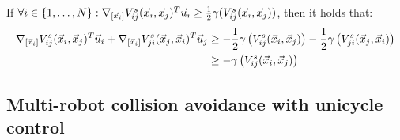 \begin{description}
        \begin{remark}
            If $\forall i \in \{1, \dots, N\}: \nabla_{[{\vec{x}}_i]} V_{ij}^s({\vec{x}}_i, {\vec{x}}_j)^T {\vec{u}}_i \geq \frac{1}{2} \gamma (V_{ij}^s({\vec{x}}_i, {\vec{x}}_j))$, then it holds that:
            \[
                \begin{split}
                    \nabla_{[{\vec{x}}_i]} V_{ij}^s({\vec{x}}_i, {\vec{x}}_j)^T {\vec{u}}_i + \nabla_{[{\vec{x}}_i]} V_{ji}^s({\vec{x}}_j, {\vec{x}}_i)^T {\vec{u}}_j 
                    &\geq -\frac{1}{2} \gamma\left( V_{ij}^s({\vec{x}}_i, {\vec{x}}_j) \right) - \frac{1}{2} \gamma\left( V_{ji}^s({\vec{x}}_j, {\vec{x}}_i) \right) \\
                    &\geq - \gamma\left( V_{ij}^s({\vec{x}}_i, {\vec{x}}_j) \right)
                \end{split}
            \]
        \end{remark}
\end{description}


\subsection{Multi-robot collision avoidance with unicycle control}

